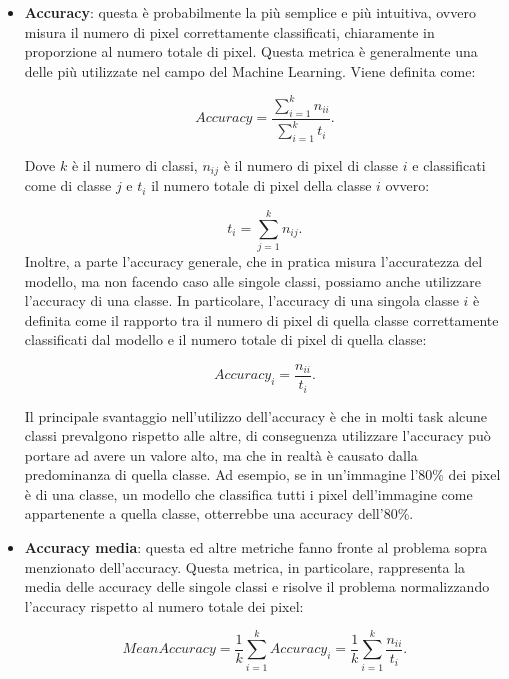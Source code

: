 \begin{itemize}
    \item \textbf{Accuracy}: questa è probabilmente la più semplice e più intuitiva, ovvero misura il numero di pixel correttamente classificati, chiaramente in proporzione al numero totale di pixel. Questa metrica è generalmente una delle più utilizzate nel campo del Machine Learning.
    Viene definita come:
    
    \begin{equation}
        Accuracy = \frac{\sum_{i=1}^k{n_{ii}}}{\sum_{i=1}^k{t_{i}}}.
    \end{equation}
    
    Dove $k$ è il numero di classi, $n_{ij}$ è il numero di pixel di classe $i$ e classificati come di classe $j$ e $t_{i}$ il numero totale di pixel della classe $i$ ovvero:
    
    \begin{equation}
        t_{i} = \sum_{j=1}^k{n_{ij}}.
    \end{equation}
    Inoltre, a parte l'accuracy generale, che in pratica misura l'accuratezza del modello, ma non facendo caso alle singole classi, possiamo anche utilizzare l'accuracy di una classe. In particolare, l'accuracy di una singola classe $i$ è definita come il rapporto tra il numero di pixel di quella classe correttamente classificati dal modello e il numero totale di pixel di quella classe:
    
    \begin{equation}
        Accuracy_{i} = \frac{n_{ii}}{t_{i}}.
    \end{equation}
    
    Il principale svantaggio nell'utilizzo dell'accuracy è che in molti task alcune classi prevalgono rispetto alle altre, di conseguenza utilizzare l'accuracy può portare ad avere un valore alto, ma che in realtà è causato dalla predominanza di quella classe. Ad esempio, se in un'immagine l'80\% dei pixel è di una classe, un modello che classifica tutti i pixel dell'immagine come appartenente a quella classe, otterrebbe una accuracy dell'80\%.
    
    
    \item \textbf{Accuracy media}: questa ed altre metriche fanno fronte al problema sopra menzionato dell'accuracy. Questa metrica, in particolare, rappresenta la media delle accuracy delle singole classi e risolve il problema normalizzando l'accuracy rispetto al numero totale dei pixel:
    
    \begin{equation}
        MeanAccuracy = \frac{1}{k} \sum_{i=1}^k{Accuracy_{i}} = \frac{1}{k} \sum_{i=1}^k{\frac{n_{ii}}{t_{i}}}.
    \end{equation}
    

\end{itemize}
